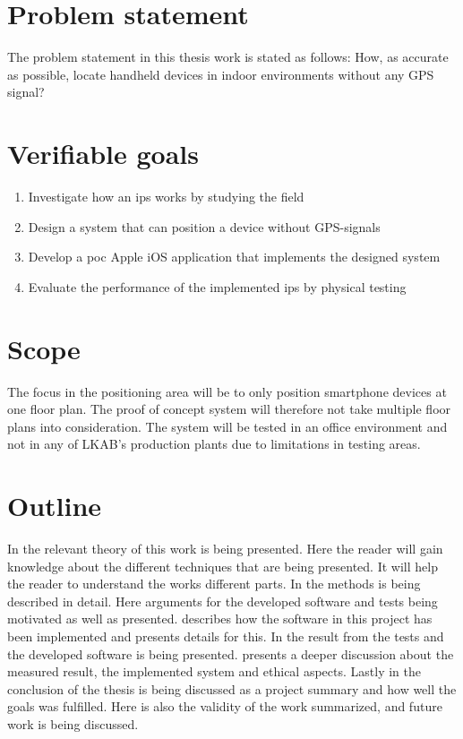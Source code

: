 \section{Problem statement}\label{sec:introProblemStatement}
The problem statement in this thesis work is stated as follows: How, as accurate as possible, locate handheld devices in indoor environments without any GPS signal?

\section{Verifiable goals}\label{sec:introGoals}
\begin{enumerate}
	\item \label{goal:fieldInvestigation}
	Investigate how an \acrfull{ips} works by studying the field

	\item \label{goal:systemDesign}
	Design a system that can position a device without GPS-signals

	\item \label{goal:poc}
	Develop a \acrlong{poc} Apple iOS application that implements the designed system

	\item \label{goal:systemEvaluation}
	Evaluate the performance of the implemented \acrlong{ips} by physical testing
\end{enumerate}


\section{Scope}
The focus in the positioning area will be to only position smartphone devices at one floor plan.
The proof of concept system will therefore not take multiple floor plans into consideration.
The system will be tested in an office environment and not in any of LKAB's production plants due to
limitations in testing areas.


\section{Outline}
In  the relevant theory of this work is being presented.
Here the reader will gain knowledge about the different techniques that are being presented.
It will help the reader to understand the works different parts.
In  the methods is being described in detail.
Here arguments for the developed software and tests being motivated as well as presented.
 describes how the software in this project has been implemented and presents details for this.
In  the result from the tests and the developed software is being presented.
 presents a deeper discussion about the measured result, the implemented system and ethical aspects.
Lastly in  the conclusion of the thesis is being discussed as a project summary and how well the goals was fulfilled.
Here is also the validity of the work summarized, and future work is being discussed.

